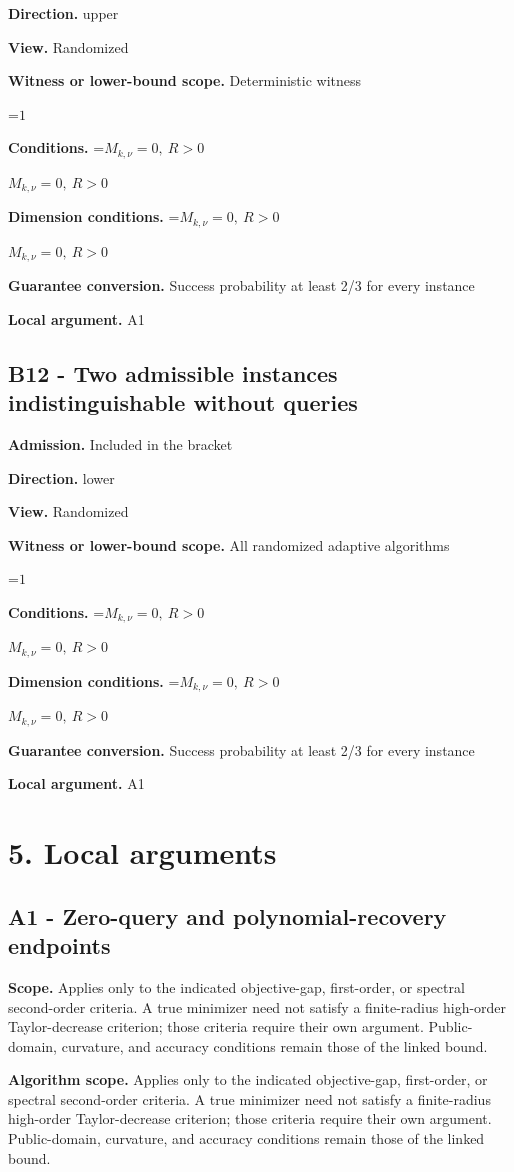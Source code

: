 \documentclass[10pt,a4paper]{article}
\newcommand{\AtlasMath}[1]{\par\begingroup\centering\setbox0=\hbox{$\displaystyle #1$}\ifdim\wd0>1.4\linewidth\typeout{ATLAS WIDE FORMULA: \the\wd0}\fi\ifdim\wd0>\linewidth\resizebox{\linewidth}{!}{\box0}\else\box0\fi\par\endgroup}
\newcommand{\AtlasInlineMath}[1]{\begingroup\setbox0=\hbox{$#1$}\ifdim\wd0>.4\linewidth\endgroup\AtlasMath{#1}\else\endgroup$#1$\fi}
\begin{document}
\textbf{Direction.} upper

\textbf{View.} Randomized

\textbf{Witness or lower-bound scope.} Deterministic witness

\AtlasMath{1}
\textbf{Conditions.} \AtlasInlineMath{M_{k,\nu}=0,\ R>0}

\textbf{Dimension conditions.} \AtlasInlineMath{M_{k,\nu}=0,\ R>0}

\textbf{Guarantee conversion.} Success probability at least 2/3 for every instance

\textbf{Local argument.} A1

\subsection{B12 - Two admissible instances indistinguishable without queries}
\textbf{Admission.} Included in the bracket

\textbf{Direction.} lower

\textbf{View.} Randomized

\textbf{Witness or lower-bound scope.} All randomized adaptive algorithms

\AtlasMath{1}
\textbf{Conditions.} \AtlasInlineMath{M_{k,\nu}=0,\ R>0}

\textbf{Dimension conditions.} \AtlasInlineMath{M_{k,\nu}=0,\ R>0}

\textbf{Guarantee conversion.} Success probability at least 2/3 for every instance

\textbf{Local argument.} A1

\section{5. Local arguments}
\subsection{A1 - Zero-query and polynomial-recovery endpoints}
\textbf{Scope.} Applies only to the indicated objective-gap, first-order, or spectral second-order criteria. A true minimizer need not satisfy a finite-radius high-order Taylor-decrease criterion; those criteria require their own argument. Public-domain, curvature, and accuracy conditions remain those of the linked bound.

\textbf{Algorithm scope.} Applies only to the indicated objective-gap, first-order, or spectral second-order criteria. A true minimizer need not satisfy a finite-radius high-order Taylor-decrease criterion; those criteria require their own argument. Public-domain, curvature, and accuracy conditions remain those of the linked bound.
\end{document}
